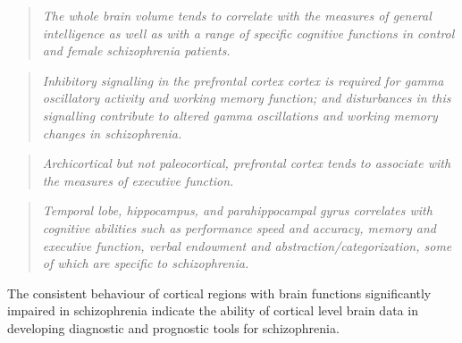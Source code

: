 \begin{quotation}
	\textit{The whole brain volume tends to correlate with the measures of general intelligence as well as with a range of specific cognitive functions in control and female schizophrenia patients.}
	\begin{flushright}
		\cite{antonova2004relationship}
	\end{flushright}
\end{quotation}
\begin{quotation}
	\textit{Inhibitory signalling in the prefrontal cortex cortex is required for gamma oscillatory activity and working memory function; and disturbances in this signalling contribute to altered gamma oscillations and working memory changes in schizophrenia.}
	\begin{flushright}
		\cite{rolls2021attractor}
	\end{flushright}
\end{quotation}
\begin{quotation}
	\textit{Archicortical but not paleocortical, prefrontal cortex tends to associate with the measures of executive function.}
	\begin{flushright}
		\cite{antonova2004relationship}
	\end{flushright}
\end{quotation}
\begin{quotation}
	\textit{Temporal lobe, hippocampus, and parahippocampal gyrus correlates with cognitive abilities such as performance speed and accuracy, memory and executive function, verbal endowment and abstraction/categorization, some of which are specific to schizophrenia.}
	\begin{flushright}
		\cite{antonova2004relationship}
	\end{flushright}
\end{quotation}
The consistent behaviour of cortical regions with brain functions significantly impaired in schizophrenia indicate the ability of cortical level brain data in developing diagnostic and prognostic tools for schizophrenia.

